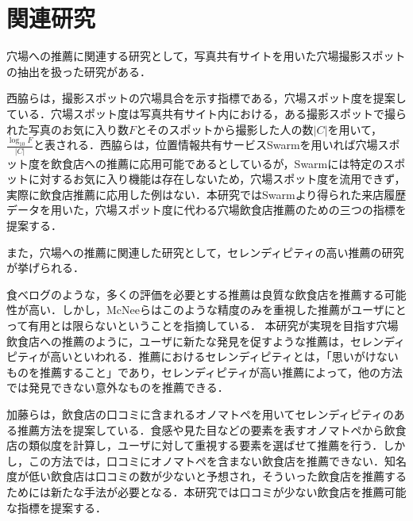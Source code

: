 \chapter{関連研究}

穴場への推薦に関連する研究として，写真共有サイトを用いた穴場撮影スポットの抽出を扱った研究がある．\par
西脇ら\cite{picture}は，撮影スポットの穴場具合を示す指標である，穴場スポット度を提案している．穴場スポット度は写真共有サイト内における，ある撮影スポットで撮られた写真のお気に入り数$F$とそのスポットから撮影した人の数$|C|$を用いて，$\frac{\log_{10}F}{|C|}$と表される．西脇らは，位置情報共有サービスSwarmを用いれば穴場スポット度を飲食店への推薦に応用可能であるとしているが，Swarmには特定のスポットに対するお気に入り機能は存在しないため，穴場スポット度を流用できず，実際に飲食店推薦に応用した例はない．本研究ではSwarmより得られた来店履歴データを用いた，穴場スポット度に代わる穴場飲食店推薦のための三つの指標を提案する．\par
また，穴場への推薦に関連した研究として，セレンディピティの高い推薦の研究が挙げられる．\par
食べログのような，多くの評価を必要とする推薦は良質な飲食店を推薦する可能性が高い．しかし，McNeeら\cite{McNee}はこのような精度のみを重視した推薦がユーザにとって有用とは限らないということを指摘している．
本研究が実現を目指す穴場飲食店への推薦のように，ユーザに新たな発見を促すような推薦は，セレンディピティが高いといわれる．推薦におけるセレンディピティとは，「思いがけないものを推薦すること」であり\cite{McNee}，セレンディピティが高い推薦によって，他の方法では発見できない意外なものを推薦できる\cite{Parameswaran}．\par
加藤ら\cite{onomatopoeia}は，飲食店の口コミに含まれるオノマトペを用いてセレンディピティのある推薦方法を提案している．食感や見た目などの要素を表すオノマトペから飲食店の類似度を計算し，ユーザに対して重視する要素を選ばせて推薦を行う．しかし，この方法では，口コミにオノマトペを含まない飲食店を推薦できない．知名度が低い飲食店は口コミの数が少ないと予想され，そういった飲食店を推薦するためには新たな手法が必要となる．本研究では口コミが少ない飲食店を推薦可能な指標を提案する．
